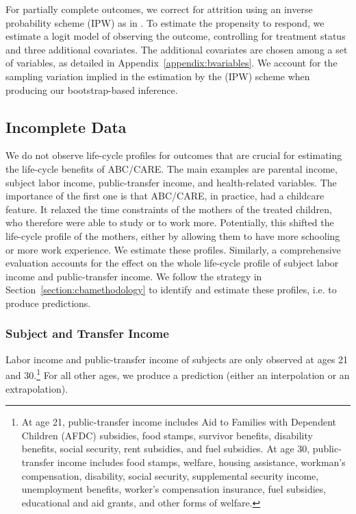 \noindent For partially complete outcomes, we correct for attrition using an inverse probability scheme (IPW) as in  \citet{Horvitz_Thompson_1952_JASA}. To estimate the propensity to respond, we estimate a logit model of observing the outcome,
controlling for treatment status and three additional covariates. The additional covariates are
chosen among a set of variables, as detailed in Appendix~\ref{appendix:bvariables}. We account for the sampling variation implied in the estimation by the (IPW) scheme when producing our bootstrap-based inference.

\subsection{Incomplete Data}
\label{app:method_noobs}

\noindent We do not observe life-cycle profiles for outcomes that are crucial for estimating the life-cycle benefits of ABC/CARE. The main examples are parental income, subject labor income, public-transfer income, and health-related variables. The importance of the first one is that ABC/CARE, in practice, had a childcare feature. It relaxed the time constraints of the mothers of the treated children, who therefore were able to study or to work more. Potentially, this shifted the life-cycle profile of the mothers, either by allowing them to have more schooling or more work experience. We estimate these profiles. Similarly, a comprehensive evaluation accounts for the effect on the whole life-cycle profile of subject labor income and public-transfer income. We follow the strategy in Section~\ref{section:cbamethodology} to identify and estimate these profiles, i.e. to produce predictions.

\subsubsection{Subject and Transfer Income}

\noindent Labor income and public-transfer income of subjects are only observed at ages 21 and 30.\footnote{At age 21, public-transfer income includes Aid to Families with Dependent Children (AFDC) subsidies, food stamps, survivor benefits, disability benefits, social security, rent subsidies, and fuel subsidies. At age 30, public-transfer income includes food stamps, welfare, housing assistance, workman's compensation, disability, social security, supplemental security income, unemployment benefits, worker's compensation insurance, fuel subsidies, educational and aid grants, and other forms of welfare.} For all other ages, we produce a prediction (either an interpolation or an extrapolation).

